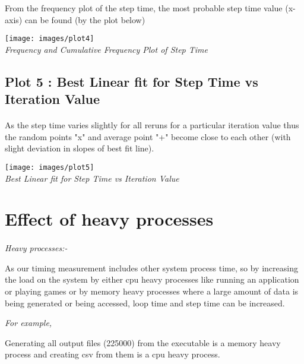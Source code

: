 \documentclass[11pt]{article}
\begin{document}
From the frequency plot of the step time, the most probable step time value (x-axis) 
can be found (by the plot below)
\begin{center}
 \texttt{[image: images/plot4]} \\
  \emph{Frequency and Cumulative Frequency Plot of Step Time} \\
\end{center}

\subsection{Plot 5 : Best Linear fit for Step Time vs Iteration Value}
\paragraph{}
As the step time varies slightly for all reruns for a particular iteration value thus the random points "x"
and average point "+" become close to each other (with slight deviation in slopes of best fit line).
\begin{center}
 \texttt{[image: images/plot5]} \\
  \emph{Best Linear fit for Step Time vs Iteration Value} \\
\end{center}


\section{Effect of heavy processes}
\paragraph{}

\textit{Heavy processes:-}

As our timing measurement includes other system process time, so by increasing the load on the system by either
 cpu heavy processes like running an application or playing games or by memory heavy processes where a large amount of data
  is being generated or being accessed, loop time and step time can be increased.

\textit{For example,}

Generating all output files (225000) from the executable is a memory heavy process and creating csv from them is a 
cpu heavy process.
\end{document}
